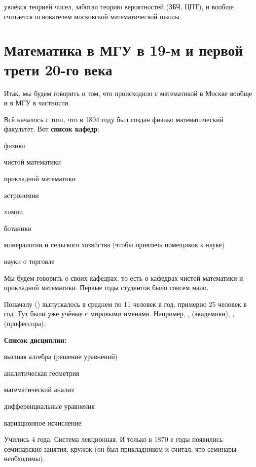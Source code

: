\documentclass[a4paper,oneside,fleqn,10pt]{article}
\begin{document}
 увлёкся теорией чисел, заботал теорию вероятностей
(ЗБЧ, ЦПТ), и вообще считается основателем московской математической
школы.


\section{Математика в МГУ в 19-м и первой трети 20-го века}

Итак, мы будем говорить о том, что происходило с математикой в Москве
вообще и в МГУ в частности.

Всё началось с того, что в 1804 году был создан физико математический
факультет.  Вот \textbf{список кафедр}:
\begin{nums}{-2}
\item физики
\item чистой математики
\item прикладной математики
\item астрономии
\item химии
\item ботаники
\item минералогии и сельского хозяйства (чтобы привлечь помещиков к
  науке)
\item науки о торговле
\end{nums}

Мы будем говорить о своих кафедрах, то есть о кафедрах чистой
математики и прикладной математики. Первые годы студентов было совсем
мало.

Поначалу () выпускалось в среднем по 11 человек в год.
 примерно 25 человек в год. Тут были уже учёные с
мировыми именами. Например, ,  (академики),
,  (профессора).

\textbf{Список дисциплин:}

\begin{nums}{-2}
\item высшая алгебра (решение уравнений)
\item аналитическая геометрия
\item математический анализ
\item дифференциальные уравнения
\item вариационное исчисление
\end{nums}

Учились 4 года. Система лекционная. И только в 1870 е годы появились
семинарские занятия, кружок  (он был
прикладником и считал, что семинары необходимы).
\end{document}
